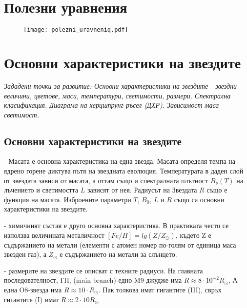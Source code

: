 \documentclass[a4paper,12pt]{article}
\begin{document}
\section*{Полезни уравнения}

\begin{figure}[h!] %
\centering
\texttt{[image: polezni\_uravneniq.pdf]}
\label{fig:SZE}
\end{figure}


\section{Основни характеристики на звездите}
\textit{Зададени точки за развитие: Основни характеристики на звездите -  звездни величини, цветове, маси, температури, светимости, размери. Спектрална класификация.  Диаграма на херцшпрунг-ръсел (ДХР). Зависимост маса-светимост.}\\

\subsection{Основни характеристики на звездите}

- Масата е основна характеристика на една звезда. Масата определя темпа на ядрено  горене диктува пътя на звездната еволюция.  Температурата в даден слой от звездата зависи от масата, а оттам също и спектралната плътност $B_{\nu}(T)$ на лъчението и светимостта $L$ зависят от нея. Радиусът на Звездата $R$ също е функция на масата. Изброените параметри $T$, $B_0$, $L$ и $R$ също са основни характеристики на звездите.

- химичният състав е друго основна характеристика. В практиката често се използва величината металичност $[Fe/H] = lg(Z/Z_\odot)$, където Z  е съдържанието на метали (елементи с атомен номер по-голям от единица маса звезден газ), а $Z_\odot$  е съдържанието на метали за слънцето.

-  размерите на звездите се описват с техните радиуси. На главната последователност, ГП, (main branch)  едно M9-джудже има $R\approx 8 \cdot 10^{-2} R_\odot$, А една O8-звезда има $R\approx 10 \cdot R_\odot$.  Пак толкова имат гигантите (III),  свръх гигантите (I) имат $R\approx 2 \cdot 10 R_\odot$
\end{document}
